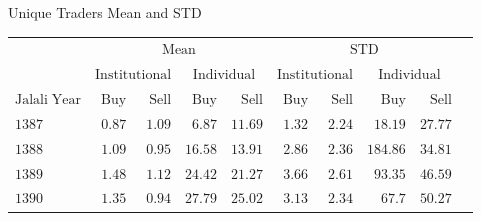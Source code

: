 \documentclass{beamer}
\begin{document}
\begin{frame}{Unique Traders Mean and STD}
    \centering
    \fontsize{8}{9} \selectfont
    \begin{tabular}{lrrrrrrrrr}
        \toprule
                                    & \multicolumn{4}{c}{\(\mathrm{Mean}\)}          & \multicolumn{4}{c}{\(\mathrm{STD}\)}                                                                                                                                                                                             \\
        \cmidrule(l){2-5} \cmidrule(l){6-9}
                                    & \multicolumn{2}{c}{\(\mathrm{Institutional}\)} & \multicolumn{2}{c}{\(\mathrm{Individual}\)} & \multicolumn{2}{c}{\(\mathrm{Institutional}\)} & \multicolumn{2}{c}{\(\mathrm{Individual}\)}                                                                                       \\
        \cmidrule(l){2-3} \cmidrule(l){4-5} \cmidrule(l){6-7}\cmidrule(l){8-9}
        \(\mathrm{Jalali \; Year}\) & \(\mathrm{Buy}\)                               & \(\mathrm{Sell}\)                           & \(\mathrm{Buy}\)                               & \(\mathrm{Sell}\)                           & \(\mathrm{Buy}\)  & \(\mathrm{Sell}\) & \(\mathrm{Buy}\)     & \(\mathrm{Sell}\)    \\
        \midrule
        \(\mathrm{1387}\)           & \(\mathrm{0.87}\)                              & \(\mathrm{1.09}\)                           & \(\mathrm{6.87}\)                              & \(\mathrm{11.69}\)                          & \(\mathrm{1.32}\) & \(\mathrm{2.24}\) & \(\mathrm{18.19}\)   & \(\mathrm{27.77}\)   \\
        \(\mathrm{1388}\)           & \(\mathrm{1.09}\)                              & \(\mathrm{0.95}\)                           & \(\mathrm{16.58}\)                             & \(\mathrm{13.91}\)                          & \(\mathrm{2.86}\) & \(\mathrm{2.36}\) & \(\mathrm{184.86}\)  & \(\mathrm{34.81}\)   \\
        \(\mathrm{1389}\)           & \(\mathrm{1.48}\)                              & \(\mathrm{1.12}\)                           & \(\mathrm{24.42}\)                             & \(\mathrm{21.27}\)                          & \(\mathrm{3.66}\) & \(\mathrm{2.61}\) & \(\mathrm{93.35}\)   & \(\mathrm{46.59}\)   \\
        \(\mathrm{1390}\)           & \(\mathrm{1.35}\)                              & \(\mathrm{0.94}\)                           & \(\mathrm{27.79}\)                             & \(\mathrm{25.02}\)                          & \(\mathrm{3.13}\) & \(\mathrm{2.34}\) & \(\mathrm{67.7}\)    & \(\mathrm{50.27}\)   \\

\end{tabular}
\end{frame}
\end{document}
